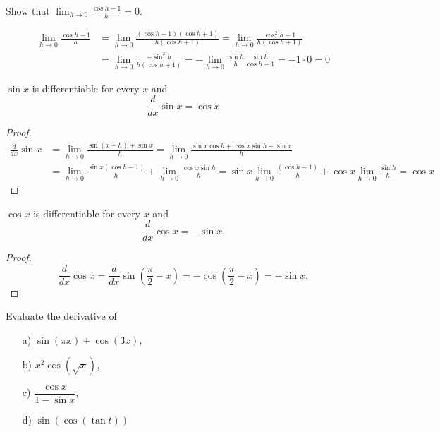 \documentclass[../main.tex]{subfiles}
\begin{document}
  \begin{example}
    Show that $\lim_{h \to 0} \frac{\cos h - 1}{h} = 0$.
  \end{example}
  \begin{solution}
    \[
      \begin{split}
      \lim_{h \to 0} \frac{\cos h - 1}{h} & =
      \lim_{h \to 0} \frac{(\cos h - 1)(\cos h + 1)}{h(\cos h + 1)} =
      \lim_{h \to 0} \frac{\cos^2 h - 1}{h(\cos h + 1)} \\
      &= \lim_{h \to 0} \frac{-\sin^2 h}{h(\cos h + 1)}
      = -\lim_{h \to 0} \frac{\sin h}{h} \frac{\sin h}{\cos h + 1} = -1 \cdot 0 = 0
      \end{split}
    \]
  \end{solution}
  \begin{theorem}
    $\sin x$ is differentiable for every $x$ and
    \[
      \frac{d}{dx} \sin x = \cos x
    \]
  \end{theorem}
  \begin{proof}
    \[
      \begin{split}
        \frac{d}{dx} \sin x & =
        \lim_{h \to 0} \frac{\sin(x+h) + \sin x}{h} =
        \lim_{h \to 0} \frac{\sin x \cos h + \cos x \sin h - \sin x}{h}\\ &=
        \lim_{h \to 0} \frac{\sin x (\cos h-1)}{h} + \lim_{h \to 0} \frac{\cos x \sin h}{h} =
        \sin x \lim_{h \to 0} \frac{(\cos h-1)}{h} + \cos x \lim_{h \to 0} \frac{\sin h}{h} = \cos x
      \end{split}
    \]
  \end{proof}

  \begin{theorem}
    $\cos x$ is differentiable for every $x$ and
    \[
      \frac{d}{dx} \cos x = -\sin x.
    \]
  \end{theorem}
  \begin{proof}
    \[
      \frac{d}{dx} \cos x =
      \frac{d}{dx} \sin\left(\frac{\pi}{2} -x\right) =
      - \cos\left(\frac{\pi}{2} -x\right) = - \sin x.
    \]
  \end{proof}
  \begin{example}
    Evaluate the derivative of
    \begin{itemize}
      \item[a)] $\sin(\pi x) + \cos(3x)$,
      \item[b)] $x^2 \cos(\sqrt{x})$,
      \item[c)] $\dfrac{\cos x}{1- \sin x}$,
      \item[d)] $\sin(\cos(\tan t))$
    \end{itemize}
  \end{example}
\end{document}
